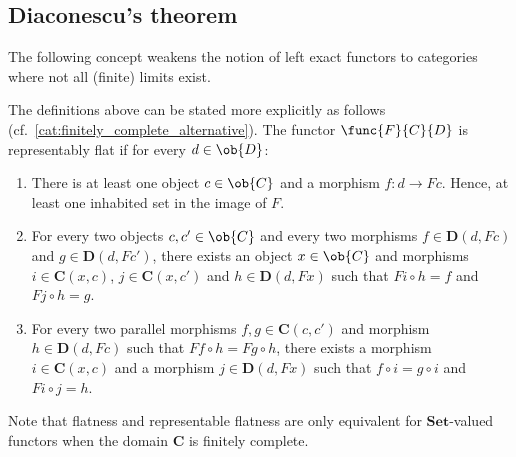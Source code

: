 \subsection{Diaconescu's theorem}\label{section:diaconescu}

    The following concept weakens the notion of left exact functors to categories where not all (finite) limits exist.

    The definitions above can be stated more explicitly as follows (cf.~\cref{cat:finitely_complete_alternative}). The functor $\func{F}{C}{D}$ is representably flat if for every $d\in\ob{D}$:
    \begin{enumerate}
        \item There is at least one object $c\in\ob{C}$ and a morphism $f:d\rightarrow Fc$. Hence, at least one inhabited set in the image of $F$.
        \item For every two objects $c,c'\in\ob{C}$ and every two morphisms $f\in\mathbf{D}(d,Fc)$ and $g\in\mathbf{D}(d,Fc')$, there exists an object $x\in\ob{C}$ and morphisms $i\in\mathbf{C}(x,c)$, $j\in\mathbf{C}(x,c')$ and $h\in\mathbf{D}(d,Fx)$ such that $Fi\circ h=f$ and $Fj\circ h=g$.
        \item For every two parallel morphisms $f,g\in\mathbf{C}(c,c')$ and morphism $h\in\mathbf{D}(d,Fc)$ such that $Ff\circ h=Fg\circ h$, there exists a morphism $i\in\mathbf{C}(x,c)$ and a morphism $j\in\mathbf{D}(d,Fx)$ such that $f\circ i=g\circ i$ and $Fi\circ j=h$.
    \end{enumerate}

    \begin{remark}
        Note that flatness and representable flatness are only equivalent for $\mathbf{Set}$-valued functors when the domain $\mathbf{C}$ is finitely complete.
    \end{remark}


